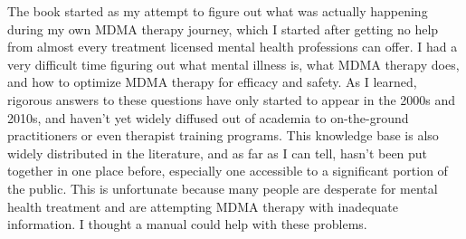 \documentclass[12pt,letterpaper]{book}
\begin{document}
The book started as my attempt to figure out what was actually happening during my own MDMA therapy journey, which I started after getting no help from almost every treatment licensed mental health professions can offer. I had a very difficult time figuring out what mental illness is, what MDMA therapy does, and how to optimize MDMA therapy for efficacy and safety. As I learned, rigorous answers to these questions have only started to appear in the 2000s and 2010s, and haven't yet widely diffused out of academia to on-the-ground practitioners or even therapist training programs. This knowledge base is also widely distributed in the literature, and as far as I can tell, hasn't been put together in one place before, especially one accessible to a significant portion of the public. This is unfortunate because many people are desperate for mental health treatment and are attempting MDMA therapy with inadequate information. I thought a manual could help with these problems.


\end{document}
